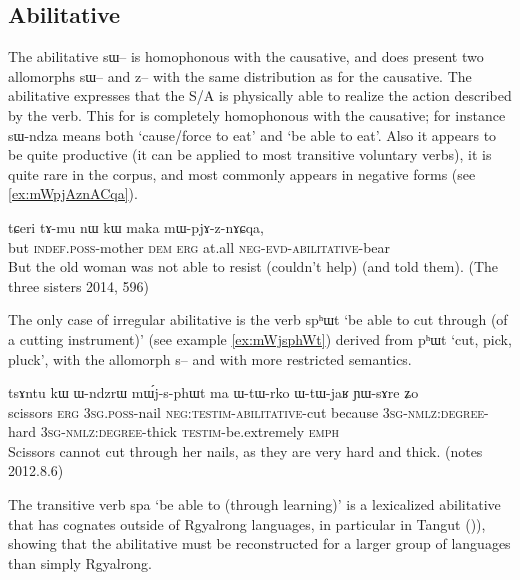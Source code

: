 \documentclass[oldfontcommands,oneside,a4paper,11pt]{article}
\newcommand{\ipa}[1]{{\phon \mbox{#1}}} %
\begin{document}
\subsection{Abilitative}
The abilitative \ipa{sɯ--} is homophonous with the causative, and does   present two allomorphs \ipa{sɯ--} and \ipa{z--} with the same distribution as for the causative. The abilitative expresses that the S/A is physically able to realize the action described by the verb. This for is completely homophonous with the causative; for instance \ipa{sɯ-ndza} means both `cause/force to eat' and `be able to eat'. Also it appears to be quite productive (it can be applied to most transitive voluntary verbs), it is quite rare in the corpus, and most commonly appears in negative forms (see \ref{ex:mWpjAznACqa}).



 \begin{exe}
\ex \label{ex:mWpjAznACqa}
\gll
\ipa{tɕeri} 	\ipa{tɤ-mu} 	\ipa{nɯ} 	\ipa{kɯ} 	\ipa{maka} 	\ipa{mɯ-pjɤ-z-nɤɕqa,} \\
but \textsc{indef.poss}-mother \textsc{dem} \textsc{erg} at.all \textsc{neg-evd-abilitative}-bear \\
\glt But the old woman was not able to resist (couldn't help) (and told them). (The three sisters 2014, 596)
   \end{exe}

 

The only case of irregular abilitative is the verb \ipa{spʰɯt} `be able to cut through (of a cutting instrument)' (see example \ref{ex:mWjsphWt}) derived from \ipa{pʰɯt} `cut, pick, pluck', with the   allomorph \ipa{s--} and with more restricted semantics.

 \begin{exe}
\ex \label{ex:mWjsphWt}
\gll
\ipa{tsɤntu} 	\ipa{kɯ} 	\ipa{ɯ-ndzrɯ} 	\ipa{mɯ́j-s-phɯt} 	\ipa{ma} 	\ipa{ɯ-tɯ-rko} 	\ipa{ɯ-tɯ-jaʁ} 	\ipa{ɲɯ-sɤre} 	\ipa{ʑo} \\
scissors \textsc{erg} \textsc{3sg.poss}-nail \textsc{neg:testim-abilitative}-cut because \textsc{3sg-nmlz:degree}-hard \textsc{3sg-nmlz:degree}-thick \textsc{testim}-be.extremely \textsc{emph} \\
\glt Scissors cannot cut through her nails, as they are very hard and thick. (notes 2012.8.6)
   \end{exe}
   
The transitive verb \ipa{spa} `be able to (through learning)' is a lexicalized abilitative that has cognates outside of Rgyalrong languages, in particular in Tangut (\citealt[255-6]{jacques14esquisse})), showing that the abilitative must be reconstructed for a larger group of languages than simply Rgyalrong.
\end{document}
